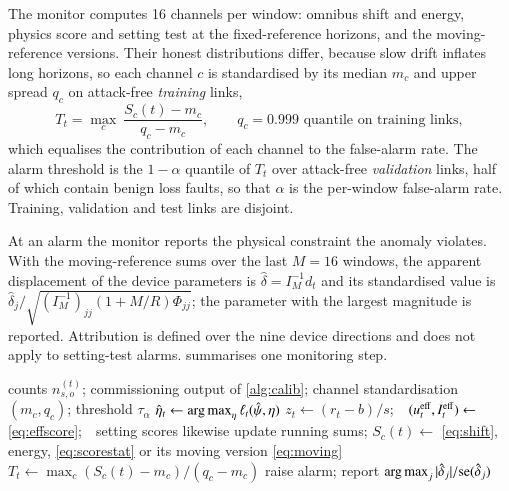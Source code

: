 The monitor computes 16 channels per window: omnibus shift and energy, physics score and setting test at the fixed-reference horizons, and the moving-reference versions. Their honest distributions differ, because slow drift inflates long horizons, so each channel $c$ is standardised by its median $m_c$ and upper spread $q_c$ on attack-free \emph{training} links,
\begin{equation}
T_t=\max_c\ \frac{S_c(t)-m_c}{q_c-m_c},\qquad q_c=\text{0.999 quantile on training links}, \label{eq:combine}
\end{equation}
which equalises the contribution of each channel to the false-alarm rate. The alarm threshold is the $1-\alpha$ quantile of $T_t$ over attack-free \emph{validation} links, half of which contain benign loss faults, so that $\alpha$ is the per-window false-alarm rate. Training, validation and test links are disjoint.

At an alarm the monitor reports the physical constraint the anomaly violates. With the moving-reference sums over the last $M=16$ windows, the apparent displacement of the device parameters is $\hat\delta=I_M^{-1}d_t$ and its standardised value is $\hat\delta_j/\sqrt{(I_M^{-1})_{jj}(1+M/R)\Phi_{jj}}$; the parameter with the largest magnitude is reported. Attribution is defined over the nine device directions and does not apply to setting-test alarms.  summarises one monitoring step.

\begin{algorithm}[t]
\caption{Monitoring step for window $t$}\label{alg:monitor}
\begin{algorithmic}[1]
\Require counts $n^{(t)}_{s,o}$; commissioning output of \cref{alg:calib}; channel standardisation $(m_c,q_c)$; threshold $\tau_\alpha$
\State $\hat\eta_t\gets\operatorname*{arg\,max}_\eta\ell_t(\hat\psi,\eta)$ 
\State $z_t\gets(r_t-b)/s$;\ \ $(u^{\rm eff}_t,I^{\rm eff}_t)\gets$ \cref{eq:effscore};\ \ setting scores likewise
  \State update running sums; $S_c(t)\gets$ \cref{eq:shift}, energy, \cref{eq:scorestat} or its moving version \eqref{eq:moving}
\EndFor
\State $T_t\gets\max_c (S_c(t)-m_c)/(q_c-m_c)$
  \State raise alarm; report $\operatorname*{arg\,max}_j |\hat\delta_j|/\mathrm{se}(\hat\delta_j)$ 
\EndIf
\end{algorithmic}
\end{algorithm}
